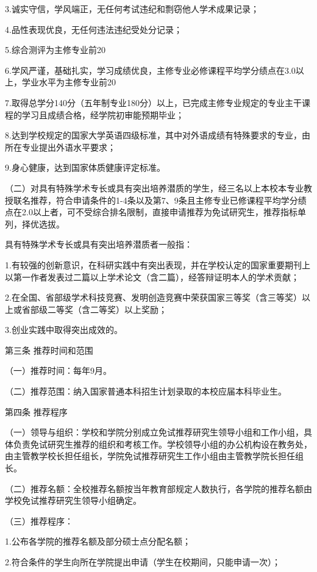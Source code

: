 \documentclass[UTF8,12pt,a4paper]{report}
\begin{document}
3.诚实守信，学风端正，无任何考试违纪和剽窃他人学术成果记录；

4.品性表现优良，无任何违法违纪受处分记录；

5.综合测评为主修专业前20%

6.学风严谨，基础扎实，学习成绩优良，主修专业必修课程平均学分绩点在3.0以上，学业水平为主修专业前20%

7.取得总学分140分（五年制专业180分）以上，已完成主修专业规定的专业主干课程的学习且成绩合格，经学院初审能预期毕业；

8.达到学校规定的国家大学英语四级标准，其中对外语成绩有特殊要求的专业，由所在专业提出外语水平要求；

9.身心健康，达到国家体质健康评定标准。

（二）对具有特殊学术专长或具有突出培养潜质的学生，经三名以上本校本专业教授联名推荐，符合申请条件的1-4条以及第7、9条且主修专业已修课程平均学分绩点在2.0以上者，可不受综合排名限制，直接申请推荐为免试研究生，推荐指标单列，择优选拔。

具有特殊学术专长或具有突出培养潜质者一般指：

1.有较强的创新意识，在科研实践中有突出表现，并在学校认定的国家重要期刊上以第一作者发表过二篇以上学术论文（含二篇），经答辩证明本人的学术贡献；

2.在全国、省部级学术科技竞赛、发明创造竞赛中荣获国家三等奖（含三等奖）以上或省部级二等奖（含二等奖）以上奖励；

3.创业实践中取得突出成效的。

第三条 推荐时间和范围

（一）推荐时间：每年9月。

（二）推荐范围：纳入国家普通本科招生计划录取的本校应届本科毕业生。

第四条 推荐程序

（一）领导与组织：学校和学院分别成立免试推荐研究生领导小组和工作小组，具体负责免试研究生推荐的组织和考核工作。学校领导小组的办公机构设在教务处，由主管教学校长担任组长，学院免试推荐研究生工作小组由主管教学院长担任组长。

（二）推荐名额：全校推荐名额按当年教育部规定人数执行，各学院的推荐名额由学校免试推荐研究生领导小组确定。

（三）推荐程序：

1.公布各学院的推荐名额及部分硕士点分配名额；

2.符合条件的学生向所在学院提出申请（学生在校期间，只能申请一次）；
\end{document}

